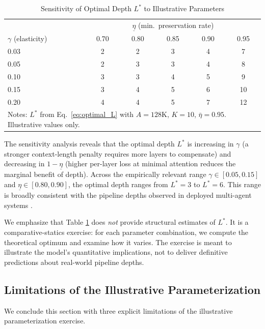\begin{table}[htbp]
\centering
\caption{Sensitivity of Optimal Depth $L^*$ to Illustrative Parameters}
\label{tab:sensitivity}
\begin{tabular}{l|ccccc}
\toprule
& \multicolumn{5}{c}{$\underline{\eta}$ (min.~preservation rate)} \\
$\gamma$ (elasticity) & 0.70 & 0.80 & 0.85 & 0.90 & 0.95 \\
\midrule
0.03 & 2 & 2 & 3 & 4 & 7 \\
0.05 & 2 & 3 & 3 & 4 & 8 \\
0.10 & 3 & 3 & 4 & 5 & 9 \\
0.15 & 3 & 4 & 5 & 6 & 10 \\
0.20 & 4 & 4 & 5 & 7 & 12 \\
\bottomrule
\multicolumn{6}{l}{\footnotesize{Notes: $L^*$ from Eq.~\ref{eq:optimal_L} with $A = 128$K, $K = 10$, $\bar{\eta} = 0.95$. Illustrative values only.}} \\
\end{tabular}
\end{table}

The sensitivity analysis reveals that the optimal depth $L^*$ is increasing in $\gamma$ (a stronger context-length penalty requires more layers to compensate) and decreasing in $1 - \underline{\eta}$ (higher per-layer loss at minimal attention reduces the marginal benefit of depth). Across the empirically relevant range $\gamma \in [0.05, 0.15]$ and $\underline{\eta} \in [0.80, 0.90]$, the optimal depth ranges from $L^* = 3$ to $L^* = 6$. This range is broadly consistent with the pipeline depths observed in deployed multi-agent systems \citep{wang2024openhands, jimenez2024swe}.

We emphasize that Table \ref{tab:sensitivity} does \emph{not} provide structural estimates of $L^*$. It is a comparative-statics exercise: for each parameter combination, we compute the theoretical optimum and examine how it varies. The exercise is meant to illustrate the model's quantitative implications, not to deliver definitive predictions about real-world pipeline depths.

\subsection{Limitations of the Illustrative Parameterization}
\label{subsec:limitations}

We conclude this section with three explicit limitations of the illustrative parameterization exercise.

